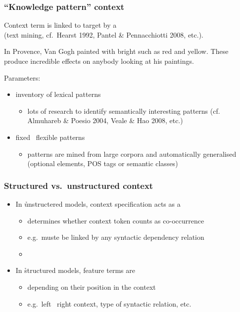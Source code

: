 \documentclass[t]{beamer} %
\begin{document}
\begin{frame}
  \frametitle{``Knowledge pattern'' context}
  
  \begin{center}
    Context term is linked to target by a \\
    (text mining, cf.\ Hearst 1992, Pantel \& Pennacchiotti 2008, etc.).
  \end{center}  

  In Provence, Van Gogh painted with bright 
  {\color{counterpoint}such as} {\color{secondary}red} {\color{counterpoint}and}
  {\color{secondary}yellow}.  These 
  {\color{counterpoint}produce} incredible {\color{secondary}effects} on
  anybody looking at his paintings.
  
  \gap
  Parameters:
  \begin{itemize}
  \item inventory of lexical patterns
    \begin{itemize}
    \item lots of research to identify semantically interesting patterns (cf. Almuhareb \& Poesio 2004,
      Veale \& Hao 2008, etc.)
    \end{itemize}
  \item fixed \vs\ flexible patterns
    \begin{itemize}
    \item patterns are mined from large corpora and automatically generalised (optional elements, POS tags or semantic classes)
    \end{itemize}
  \end{itemize}
\end{frame}

\begin{frame}[c]
  \frametitle{Structured vs.\ unstructured context}

  \begin{itemize}
  \item In \h{unstructered} models, context specification acts as a 
    \begin{itemize}
    \item determines whether context token counts as co-occurrence
    \item e.g.\ muste be linked by any syntactic dependency relation
    \item[]
    \end{itemize}
    \pause
  \item In \h{structured} models, feature terms are 
    \begin{itemize}
    \item depending on their position in the context
    \item e.g.\ left \vs\ right context, type of syntactic relation, etc.
    \end{itemize}
  \end{itemize}
\end{frame}
\end{document}
